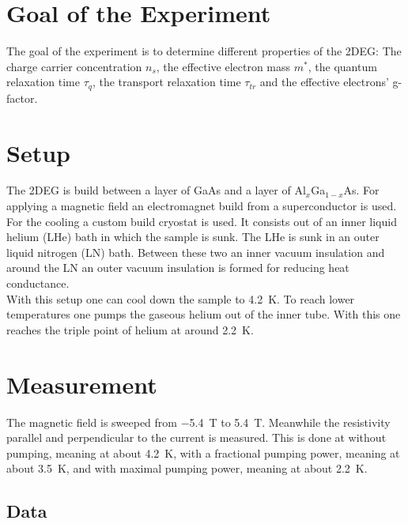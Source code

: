 \documentclass[12pt,a4paper]{article}
\begin{document}
\section{Goal of the Experiment}
The goal of the experiment is to determine different properties of the 2DEG: The charge carrier concentration $n_s$, the effective electron mass $m^*$, the quantum relaxation time $\tau _q$, the transport relaxation time $\tau _{tr}$ and the effective electrons' g-factor.


\section{Setup}
The 2DEG is build between a layer of GaAs and a layer of Al$_{x}$Ga$_{1-x}$As. For applying a magnetic field an electromagnet build from a superconductor is used. For the cooling a custom build cryostat is used. It consists out of an inner liquid helium (LHe) bath in which the sample is sunk. The LHe is sunk in an outer liquid nitrogen (LN) bath. Between these two an inner vacuum insulation and around the LN an outer vacuum insulation is formed for reducing heat conductance. \\
With this setup one can cool down the sample to \SI{4.2}{K}. To reach lower temperatures one pumps the gaseous helium out of the inner tube. With this one reaches the triple point of helium at around \SI{2.2}{K}.


\section{Measurement}
The magnetic field is sweeped from \SI{-5.4}{T} to \SI{5.4}{T}. Meanwhile the resistivity parallel and perpendicular to the current is measured. This is done at without pumping, meaning at about \SI{4.2}{K}, with a fractional pumping power, meaning at about \SI{3.5}{K}, and with maximal pumping power, meaning at about \SI{2.2}{K}.

\subsection{Data}
\end{document}
